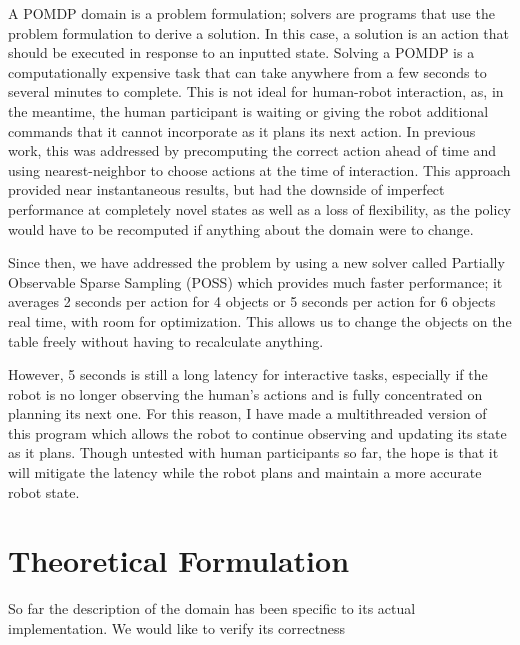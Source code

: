 \documentclass{article}
\begin{document}
A POMDP domain is a problem formulation; solvers are programs that use the problem formulation to derive a solution. In this case, a solution is an action that should be executed in response to an inputted state. Solving a POMDP is a computationally expensive task that can take anywhere from a few seconds to several minutes to complete. This is not ideal for human-robot interaction, as, in the meantime, the human participant is waiting or giving the robot additional commands that it cannot incorporate as it plans its next action. In previous work, this was addressed by precomputing the correct action ahead of time and using nearest-neighbor to choose actions at the time of interaction. This approach provided near instantaneous results, but had the downside of imperfect performance at completely novel states as well as a loss of flexibility, as the policy would have to be recomputed if anything about the domain were to change. 

Since then, we have addressed the problem by using a new solver called Partially Observable Sparse Sampling (POSS) which provides much faster performance; it averages 2 seconds per action for 4 objects or 5 seconds per action for 6 objects real time, with room for optimization. This allows us to change the objects on the table freely without having to recalculate anything. 

However, 5 seconds is still a long latency for interactive tasks, especially if the robot is no longer observing the human's actions and is fully concentrated on planning its next one. For this reason, I have made a multithreaded version of this program which allows the robot to continue observing and updating its state as it plans. Though untested with human participants so far, the hope is that it will mitigate the latency while the robot plans and maintain a more accurate robot state. 


\section{Theoretical Formulation}

So far the description of the domain has been specific to its actual implementation. We would like to verify its correctness 
\end{document}
